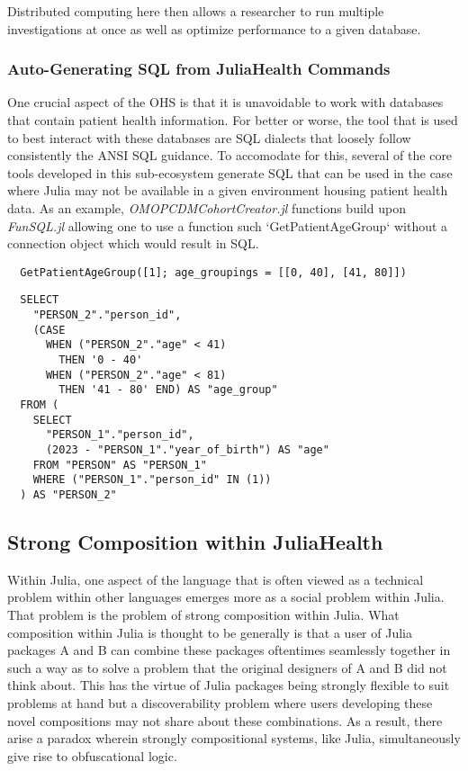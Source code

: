 \documentclass{juliacon}
\begin{document}
Distributed computing here then allows a researcher to run multiple investigations at once as well as optimize performance to a given database.


\subsubsection{Auto-Generating SQL from JuliaHealth Commands}

One crucial aspect of the OHS is that it is unavoidable to work with databases that contain patient health information.
For better or worse, the tool that is used to best interact with these databases are SQL dialects that loosely follow consistently the ANSI SQL guidance.
To accomodate for this, several of the core tools developed in this sub-ecosystem generate SQL that can be used in the case where Julia may not be available in a given environment housing patient health data.
As an example, \textit{OMOPCDMCohortCreator.jl} functions build upon \textit{FunSQL.jl} allowing one to use a function such `GetPatientAgeGroup` without a connection object which would result in SQL.

\begin{verbatim}
  GetPatientAgeGroup([1]; age_groupings = [[0, 40], [41, 80]])
\end{verbatim}

\begin{verbatim}
  SELECT
    "PERSON_2"."person_id",
    (CASE 
      WHEN ("PERSON_2"."age" < 41) 
        THEN '0 - 40' 
      WHEN ("PERSON_2"."age" < 81) 
        THEN '41 - 80' END) AS "age_group"
  FROM (
    SELECT
      "PERSON_1"."person_id",
      (2023 - "PERSON_1"."year_of_birth") AS "age"
    FROM "PERSON" AS "PERSON_1"
    WHERE ("PERSON_1"."person_id" IN (1))
  ) AS "PERSON_2"
\end{verbatim}

\subsection{Strong Composition within JuliaHealth}

Within Julia, one aspect of the language that is often viewed as a technical problem within other languages emerges more as a social problem within Julia.
That problem is the problem of strong composition within Julia.
What composition within Julia is thought to be generally is that a user of Julia packages A and B can combine these packages oftentimes seamlessly together in such a way as to solve a problem that the original designers of A and B did not think about.
This has the virtue of Julia packages being strongly flexible to suit problems at hand but a discoverability problem where users developing these novel compositions may not share about these combinations.
As a result, there arise a paradox wherein strongly compositional systems, like Julia, simultaneously give rise to obfuscational logic.
\end{document}
